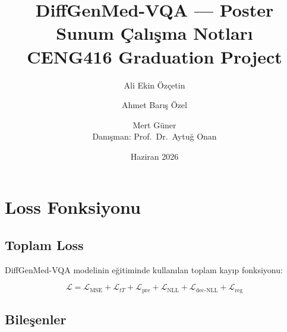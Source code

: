 \documentclass[12pt, a4paper]{article}
\title{\textbf{DiffGenMed-VQA — Poster Sunum Çalışma Notları}\\
\large CENG416 Graduation Project}
\author{Ali Ekin Özçetin \and Ahmet Barış Özel \and Mert Güner\\
\small Danışman: Prof.\ Dr.\ Aytuğ Onan}
\date{Haziran 2026}
\begin{document}
\maketitle
\tableofcontents
\newpage

\section{Loss Fonksiyonu}

\subsection{Toplam Loss}

DiffGenMed-VQA modelinin eğitiminde kullanılan toplam kayıp fonksiyonu:

\[
\mathcal{L} = \mathcal{L}_{\text{MSE}} + \mathcal{L}_{tT} + \mathcal{L}_{\text{pre}} + \mathcal{L}_{\text{NLL}} + \mathcal{L}_{\text{dec-NLL}} + \mathcal{L}_{\text{reg}}
\]

\subsection{Bileşenler}
\end{document}
